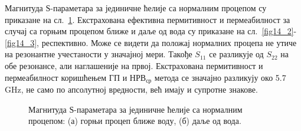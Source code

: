 Магнитуда $Ѕ$-параметара за јединичне ћелије са нормалним процепом су приказане на сл.~\ref{fig14_1}. Екстрахована ефективна пермитивност и пермеабилност за случај са горњим процепом ближе и даље од вода су приказане на сл.~\ref{fig14_2}-\ref{fig14_3}, респективно. Може се видети да положај нормалних процепа не утиче на резонантне учестаности у значајној мери. Такође $S_{11}$ се разликује од $S_{22}$ на обе резонансе, али наглашеније на првој. Екстрахована пермитивност и пермеабилност коришћењем ГП и $НРВ_{ср}$ метода се значајно разликују око 5.7\,GHz, не само по апсолутној вредности, већ имају и супротне знакове.
\begin{figure}[!t]
\centering
{}
\hfill
{}
\caption{Магнитуда $Ѕ$-параметара за јединичне ћелије са нормалним процепом: (а) горњи процеп ближе воду, (б) даље од вода.}
\label{fig14_1}
\end{figure}
